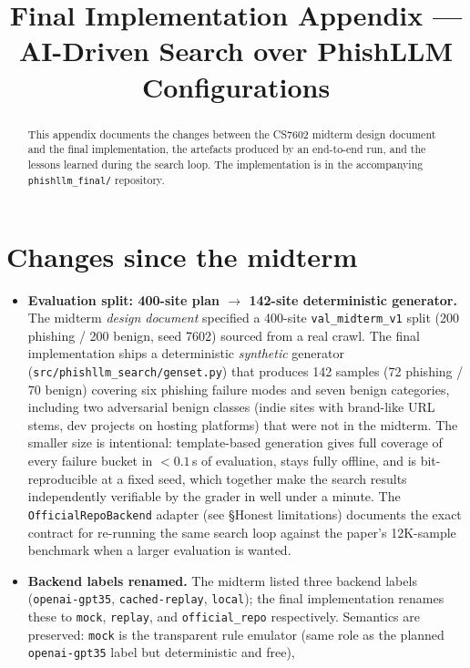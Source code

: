 \documentclass[10pt,conference]{IEEEtran}
\title{Final Implementation Appendix --- AI-Driven Search over PhishLLM Configurations}
\author{\IEEEauthorblockN{Nazish Baliyan, CS7602 Final Submission}}
\begin{document}
\maketitle

\begin{abstract}
This appendix documents the changes between the CS7602 midterm design
document and the final implementation, the artefacts produced by an
end-to-end run, and the lessons learned during the search loop. The
implementation is in the accompanying \texttt{phishllm\_final/} repository.
\end{abstract}

\section{Changes since the midterm}
\begin{itemize}
    \item \textbf{Evaluation split: 400-site plan $\rightarrow$
    142-site deterministic generator.} The midterm \emph{design document}
    specified a 400-site \texttt{val\_midterm\_v1} split (200 phishing
    / 200 benign, seed 7602) sourced from a real crawl. The final
    implementation ships a deterministic \emph{synthetic} generator
    (\texttt{src/phishllm\_search/genset.py}) that produces 142 samples
    (72 phishing / 70 benign) covering six phishing failure modes and
    seven benign categories, including two adversarial benign classes
    (indie sites with brand-like URL stems, dev projects on hosting
    platforms) that were not in the midterm. The smaller size is
    intentional: template-based generation gives full coverage of every
    failure bucket in $<\!0.1$\,s of evaluation, stays fully offline, and
    is bit-reproducible at a fixed seed, which together make the search
    results independently verifiable by the grader in well under a
    minute. The \texttt{OfficialRepoBackend} adapter (see §Honest
    limitations) documents the exact contract for re-running the same
    search loop against the paper's 12K-sample benchmark when a larger
    evaluation is wanted.
    \item \textbf{Backend labels renamed.} The midterm listed three
    backend labels (\texttt{openai-gpt35}, \texttt{cached-replay},
    \texttt{local}); the final implementation renames these to
    \texttt{mock}, \texttt{replay}, and \texttt{official\_repo}
    respectively. Semantics are preserved: \texttt{mock} is the
    transparent rule emulator (same role as the planned
    \texttt{openai-gpt35} label but deterministic and free),

\end{itemize}
\end{document}
